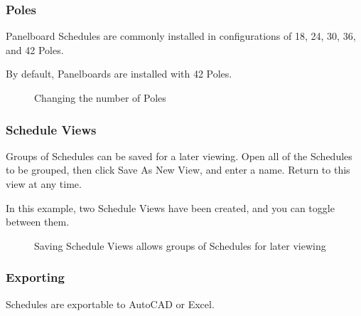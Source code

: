 \documentclass[letterpaper,10pt,english]{sphinxmanual}
\begin{document}
\subsubsection{Poles}
\label{\detokenize{docs/userguide/buildingelectricalmodel/schedules/index-schedules:poles}}
Panelboard Schedules are commonly installed in configurations of 18, 24, 30, 36, and 42 Poles.

By default, Panelboards are installed with 42 Poles.

\begin{figure}[H]
\centering
\capstart

\noindent{}
\caption{Changing the number of Poles}\label{\detokenize{docs/userguide/buildingelectricalmodel/schedules/index-schedules:id24}}\end{figure}


\subsubsection{Schedule Views}
\label{\detokenize{docs/userguide/buildingelectricalmodel/schedules/index-schedules:schedule-views}}
Groups of Schedules can be saved for a later viewing.  Open all of the Schedules to be grouped, then click Save As New View, and enter a name.  Return to this view at any time.

In this example, two Schedule Views have been created, and you can toggle between them.

\begin{figure}[H]
\centering
\capstart

\noindent{}
\caption{Saving Schedule Views allows groups of Schedules for later viewing}\label{\detokenize{docs/userguide/buildingelectricalmodel/schedules/index-schedules:id25}}\end{figure}

\ignorespaces 

\subsubsection{Exporting}
\label{\detokenize{docs/userguide/buildingelectricalmodel/schedules/index-schedules:exporting}}\label{\detokenize{docs/userguide/buildingelectricalmodel/schedules/index-schedules:exporting-schedules}}\label{\detokenize{docs/userguide/buildingelectricalmodel/schedules/index-schedules:index-7}}
Schedules are exportable to AutoCAD or Excel.
\end{document}
